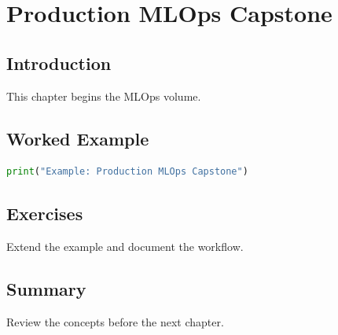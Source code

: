 \chapter{Production MLOps Capstone}
\label{chap:vol10-5}



\section{Introduction}
This chapter begins the MLOps volume.

\section{Worked Example}
\begin{lstlisting}[language=Python]
print("Example: Production MLOps Capstone")
\end{lstlisting}

\section{Exercises}
\begin{exercise}
Extend the example and document the workflow.
\end{exercise}

\section{Summary}
Review the concepts before the next chapter.

